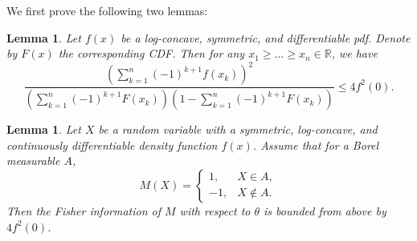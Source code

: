 \documentclass[letterpaper, conference, 11pt]{IEEEtran}      %
\newtheorem{lem}[thm]{\bf {Lemma}}
\begin{document}
We first prove the following two lemmas:
\begin{lem} \label{lem:bound_intervals}
Let $f(x)$ be a log-concave, symmetric, and differentiable pdf. Denote by $F(x)$ the corresponding CDF. Then for any $x_1 \geq \ldots \geq x_n \in \mathbb R$, we have 
\begin{equation}
\frac{ \left(  \sum_{k=1}^n (-1)^{k+1} f(x_k) \right)^2} 
{\left( \sum_{k=1}^n (-1)^{k+1} F(x_k) \right)\left(1- \sum_{k=1}^n (-1)^{k+1} F(x_k) \right)  } \leq 4f^2(0). \label{eq:bound_intervals}
\end{equation}
\end{lem}

\begin{lem} \label{lem:fisher_bound}
Let $X$ be a random variable with a symmetric, log-concave, and continuously differentiable density function $f(x)$. Assume that for a Borel measurable $A$, 
\[
M(X) = \begin{cases} 1,& X \in A, \\
-1, & X \notin A.
\end{cases}
\]
Then the Fisher information of $M$ with respect to $\theta$ is bounded from above by $4f^2(0)$.
\end{lem}
\end{document}
